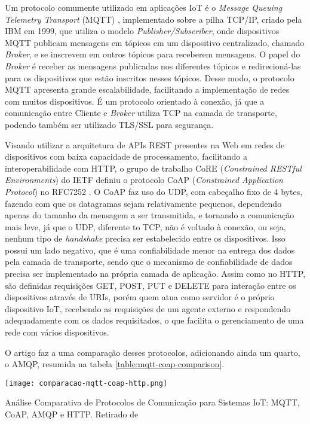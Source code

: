 \documentclass[../monografia.tex]{subfiles}
\begin{document}
Um protocolo comumente utilizado em aplicações IoT é o \textit{Message Queuing Telemetry Transport} (MQTT) \cite{mqtt-specification}, implementado sobre a pilha TCP/IP, criado pela IBM em 1999, que utiliza o modelo \textit{Publisher/Subscriber}, onde dispositivos MQTT publicam mensagens em tópicos em um dispositivo centralizado, chamado \textit{Broker}, e se inscrevem em outros tópicos para receberem mensagens. O papel do \textit{Broker} é receber as mensagens publicadas nos diferentes tópicos e redirecioná-las para os dispositivos que estão inscritos nesses tópicos. Desse modo, o protocolo MQTT apresenta grande escalabilidade, facilitando a implementação de redes com muitos dispositivos. É um protocolo orientado à conexão, já que a comunicação entre Cliente e \textit{Broker} utiliza TCP na camada de transporte, podendo também ser utilizado TLS/SSL para segurança. 

Visando utilizar a arquitetura de APIs REST presentes na Web em redes de dispositivos com baixa capacidade de processamento, facilitando a interoperabilidade com HTTP, o grupo de trabalho CoRE (\textit{Constrained RESTful Environments}) do IETF definiu o protocolo CoAP (\textit{Constrained Application Protocol}) no RFC7252 \cite{coap-specification}. O CoAP faz uso do UDP, com cabeçalho fixo de 4 bytes, fazendo com que os datagramas sejam relativamente pequenos, dependendo apenas do tamanho da mensagem a ser transmitida, e tornando a comunicação mais leve, já que o UDP, diferente to TCP, não é voltado à conexão, ou seja, nenhum tipo de \textit{handshake} precisa ser estabelecido entre os dispositivos. Isso possui um lado negativo, que é uma confiabilidade menor na entrega dos dados pela camada de transporte, sendo que o mecanismo de confiabilidade de dados precisa ser implementado na própria camada de aplicação. Assim como no HTTP, são definidas requisições GET, POST, PUT e DELETE para interação entre os dispositivos através de URIs, porém quem atua como servidor é o próprio dispositivo IoT, recebendo as requisições de um agente externo e respondendo adequadamente com os dados requisitados, o que facilita o gerenciamento de uma rede com vários dispositivos. 

O artigo \cite{mqtt-coap-comparison} faz a uma comparação desses protocolos, adicionando ainda um quarto, o AMQP, resumida na tabela \ref{table:mqtt-coap-comparison}.

\begin{table}[h]
\centering
\texttt{[image: comparacao-mqtt-coap-http.png]}
\caption{Análise Comparativa de Protocolos de Comunicação para Sistemas IoT: MQTT, CoAP, AMQP e HTTP. Retirado de \cite{mqtt-coap-comparison}}
\label{table:mqtt-coap-comparison}
\end{table}
\end{document}

